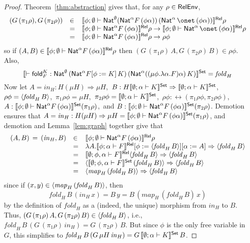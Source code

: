 \documentclass[runningheads]{llncs}
\newcommand{\fold}{\mathsf{fold}}
\begin{document}
\begin{proof}
Theorem~\ref{thm:abstraction} gives that, for any 
$\rho \in \mathsf{RelEnv}$,
\[\begin{array}{lll}
(G \,(\pi_1 \rho), G\, (\pi_2 \rho))
& \in & \relsem{\phi;\emptyset\vdash \Nat^{\emptyset} (\Nat^\alpha
  F\, (\phi\alpha))\, (\Nat^\alpha\,\onet \, (\phi\alpha))}
\rho\\ 
& = & \relsem{\phi;\emptyset\vdash \Nat^\alpha F\,
  (\phi\alpha)}\rho \to \relsem{\phi;\emptyset\vdash
  \Nat^\alpha\,\onet \, (\phi\alpha)}\rho\\ 
& = & \relsem{\phi;\emptyset\vdash \Nat^\alpha F\,
  (\phi\alpha)}\rho \to \rho \phi
\end{array}\]
\noindent
so if $(A, B) \in \llbracket{\phi;\emptyset\vdash \mathsf{Nat}^\alpha F\,
  (\phi\alpha)}\rrbracket^{\mathsf{Rel}}\rho$ then $(G \,(\pi_1 \rho)\, A, G\, (\pi_2 \rho)\,
B) \in \rho \phi$.
Also,
\[\setsem{\vdash \fold_F^K :
  \Nat^{\emptyset}\, (\Nat^\alpha F[\phi := K]\,K)\, (\Nat^\alpha
  ((\mu \phi.\lambda\alpha.F)\alpha)\,K)} = \mathit{fold}_H\]
Now let $A = \mathit{in}_H : H (\mu H) \Rightarrow
\mu H$,\, $B : H\llbracket{\emptyset;\alpha\vdash K}\rrbracket^{\mathsf{Set}} \Rightarrow
\llbracket{\emptyset;\alpha \vdash K}\rrbracket^{\mathsf{Set}}$,\, $\rho \phi =
\langle {\mathit{fold}_H\, B} \rangle$,\, $\pi_1 \rho \phi = \mu H$,\, $\pi_2
\rho \phi = \llbracket{\emptyset;\alpha\vdash K}\rrbracket^{\mathsf{Set}}$,\, $\rho \phi :
\rel(\pi_1 \rho \phi, \pi_2 \rho \phi)$,\, $A : \llbracket{\phi;
  \emptyset \vdash \mathsf{Nat}^\alpha F \, (\phi \alpha)}\rrbracket^{\mathsf{Set}} (\pi_1 \rho)$,\,
and $B : \llbracket{\phi; \emptyset \vdash \mathsf{Nat}^\alpha F \, (\phi
  \alpha)}\rrbracket^{\mathsf{Set}} (\pi_2 \rho)$.
Demotion ensures that $A = \mathit{in}_H : H(\mu H) \Rightarrow \mu H
= \llbracket{\phi;\emptyset \vdash \mathsf{Nat}^\alpha F
  \,(\phi\alpha)}\rrbracket^{\mathsf{Set}}(\pi_1\rho)$,
and demotion and Lemma~\ref{lem:graph} together give that
\[\begin{array}{lll}
(A,B) \,=\, (\mathit{in}_H,B) & \in & \llbracket{\phi;\emptyset\vdash
  \mathsf{Nat}^\alpha F\, (\phi\alpha)}\rrbracket^{\mathsf{Rel}}\rho\\
& = & \lambda A. \llbracket{\phi;\alpha\vdash F}\rrbracket^{\mathsf{Rel}}[\phi :=
  \langle {\mathit{fold}_H\, B} \rangle][\alpha := A] \Rightarrow 
 \langle {\mathit{fold}_H\, B} \rangle \\ 
& = & \llbracket{\emptyset;\phi,\alpha\vdash F}\rrbracket^{\mathsf{Rel}}
  \langle {\mathit{fold}_H\, B} \rangle \Rightarrow \langle {\mathit{fold}_H\,
    B} \rangle\\
  & = & \langle {\llbracket{\emptyset;\phi,\alpha\vdash F}\rrbracket^{\mathsf{Set}}\,(\mathit{fold}_H\,B)} \rangle \Rightarrow \langle {\mathit{fold}_H\, B} \rangle\\
  & = & \langle {\mathit{map}_H \,(\mathit{fold}_H\,B)} \rangle \Rightarrow
\langle {\mathit{fold}_H\, B} \rangle\\
\end{array}\]
since if $(x,y) \in \langle {\mathit{map}_H \,(\mathit{fold}_H\,B)} \rangle$,
then $$\mathit{fold}_H\, B\, (\mathit{in}_H\,x) = B\,y = B\,
(\mathit{map}_H \,(\mathit{fold}_H\,B) \, x)$$ by the definition of
$\mathit{fold}_H$ as a (indeed, the unique) morphism from
$\mathit{in}_H$ to $B$.  Thus, $(G \,(\pi_1 \rho)\, A, G\, (\pi_2
\rho)\, B) \in \langle {\mathit{fold}_H\, B} \rangle$, i.e., $\mathit{fold}_H \,
B \, (G\, (\pi_1 \rho) \, \mathit{in}_H) = G\,(\pi_2 \rho)\,B$.  But
since $\phi$ is the only free variable in $G$, this simplifies to
$\mathit{fold}_H\, B \, (G\, \mu H\, \mathit{in}_H) =
G\,\llbracket{\emptyset;\alpha\vdash K}\rrbracket^{\mathsf{Set}}\,B$. 
\end{proof}
\end{document}

